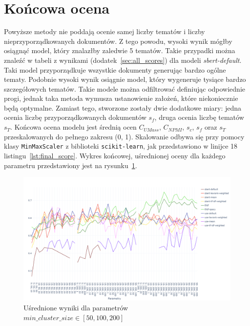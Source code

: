 \section{Końcowa ocena}
	Powyższe metody nie poddają ocenie samej liczby tematów i liczby nieprzyporządkowanych dokumentów.
	Z tego powodu, wysoki wynik mógłby osiągnąć model, który znalazłby zaledwie 5 tematów.
	Takie przypadki można znaleźć w tabeli z wynikami (dodatek~\ref{sec:all_scores}) dla modeli \emph{sbert-default}.
	Taki model przyporządkuje wszystkie dokumenty generując bardzo ogólne tematy.
	Podobnie wysoki wynik osiągnie model, który wygeneruje tysiące bardzo szczegółowych tematów.
	Takie modele można odfiltrować definiując odpowiednie progi, jednak taka metoda wymusza ustanowienie założeń,
		które niekoniecznie będą optymalne.
	Zamiast tego, stworzone zostały dwie dodatkowe miary: jedna ocenia liczbę przyporządkowanych dokumentów \(s_f\), druga ocenia liczbę tematów \(s_T\).
	Końcowa ocena modelu jest średnią ocen \(C_{UMass}\), \(C_{NPMI}\), \(s_c\), \(s_f\) oraz \(s_T\) przeskalowanych do pełnego zakresu (0, 1).
	Skalowanie odbywa się przy pomocy klasy \verb|MinMaxScaler| z biblioteki \verb|scikit-learn|,
		jak przedstawiono w linijce 18 listingu~\ref{lst:final_score}.
	Wykres końcowej, uśrednionej oceny dla każdego parametru przedstawiony jest na rysunku~\ref{fig:avg_scores}.

	\begin{figure}
		\centering
		\includegraphics[width=1.5\textwidth,angle=90]{rys05/avg.png}
		\caption{Uśrednione wyniki dla parametrów \(min\_cluster\_size\in \left[50, 100, 200\right]\)}\label{fig:avg_scores} %
	\end{figure}

